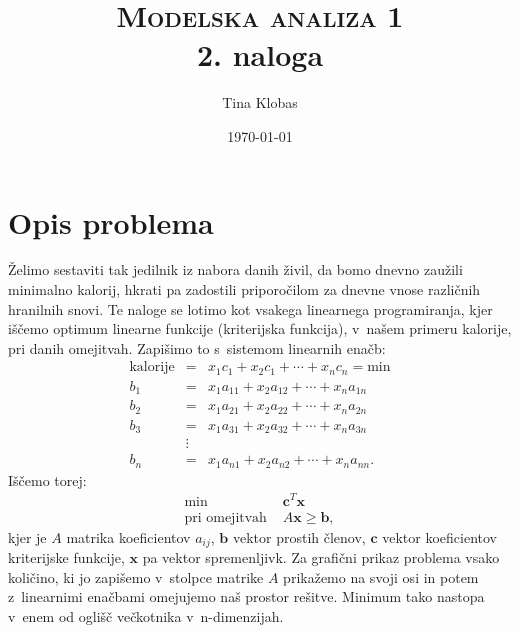 \documentclass[a4paper,pdftex,12pt]{article} %
\title{	
\normalfont \normalsize 
\textsc{Modelska analiza 1} \\ [25pt] %
\huge 2. naloga\\ %
}
\author{Tina Klobas} %
\date{\normalsize\today} %
\renewcommand{\vec}[1]{\boldsymbol{\mathbf{#1}}}
\numberwithin{equation}{section} %
\numberwithin{figure}{section} %
\numberwithin{table}{section} %
\begin{document}
\maketitle %

\section{Opis problema}
Želimo sestaviti tak jedilnik iz nabora danih živil, da bomo dnevno zaužili minimalno 
kalorij, hkrati pa zadostili priporočilom za dnevne vnose različnih hranilnih snovi. 
Te naloge se lotimo kot vsakega linearnega programiranja, kjer iščemo optimum linearne 
funkcije (kriterijska funkcija), v~našem primeru kalorije, pri danih omejitvah. Zapišimo
to s~sistemom linearnih enačb:
\begin{eqnarray*} 
    \mathrm{kalorije} &=& x_1 c_1 + x_2 c_1 + \cdots + x_n c_n = \mathrm{min} \\
	b_1 &=& x_1 a_{11} + x_2 a_{12} + \cdots + x_n a_{1n} \\
	b_2 &=& x_1 a_{21} + x_2 a_{22} + \cdots + x_n a_{2n} \\
	b_3 &=& x_1 a_{31} + x_2 a_{32} + \cdots + x_n a_{3n} \\
	    &\vdots& \\ 
	b_n &=& x_1 a_{n1} + x_2 a_{n2} + \cdots + x_n a_{nn}.
\end{eqnarray*}
Iščemo torej:
\begin{align}\label{matrika}
    \text{min } &\vec{c}^T \vec{x}  \\
    \text{pri omejitvah } &A \vec{x} \geq \vec{b}, 
\end{align}
kjer je $A$ matrika koeficientov $a_{ij}$, $\vec{b}$ vektor prostih členov, $\vec{c}$ vektor
koeficientov kriterijske funkcije, $\vec{x}$ pa vektor spremenljivk. Za grafični prikaz
problema vsako količino, ki jo zapišemo v~stolpce matrike $A$ prikažemo na svoji osi
in potem z~linearnimi enačbami omejujemo naš prostor rešitve. Minimum tako nastopa v~enem
od oglišč večkotnika v~n-dimenzijah.

\end{document}
